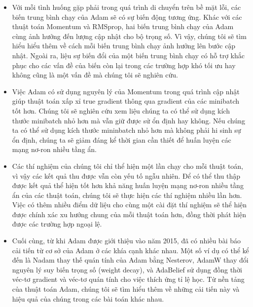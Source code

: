 \begin{itemize}
	\item Với mỗi tình huống gặp phải trong quá trình di chuyển trên bề mặt lỗi, các biến trung bình chạy của Adam sẽ có sự biến động tương ứng. Khác với các thuật toán Momentum và RMSprop, hai biến trung bình chạy của Adam cùng ảnh hưởng đến lượng cập nhật cho bộ trọng số. Vì vậy, chúng tôi sẽ tìm hiểu hiểu thêm về cách mỗi biến trung bình chạy ảnh hưởng lên bước cập nhật. Ngoài ra, liệu sự biến đổi của một biến trung bình chạy có hỗ trợ khắc phục cho các vấn đề của biến còn lại trong các trường hợp khó tối ưu hay không cũng là một vấn đề mà chúng tôi sẽ nghiên cứu.
	\item Việc Adam có sử dụng nguyên lý của Momentum trong quá trình cập nhật giúp thuật toán xấp xỉ true gradient thông qua gradient của các minibatch tốt hơn. Chúng tôi sẽ nghiên cứu xem liệu chúng ta có thể sử dụng kích thước minibatch nhỏ hơn mà vẫn giữ được sử ổn định hay không. Nếu chúng ta có thể sử dụng kích thước mininbatch nhỏ hơn mà không phải hi sinh sự ổn định, chúng ta sẽ giảm đáng kể thời gian cần thiết để huấn luyện các mạng nơ-ron nhiều tầng ẩn.
	\item Các thí nghiệm của chúng tôi chỉ thể hiện một lần chạy cho mỗi thuật toán, vì vậy các kết quả thu được vẫn còn yếu tố ngẫu nhiên. Để có thể thu thập được kết quả thể hiện tốt hơn khả năng huấn luyện mạng nơ-ron nhiều tầng ẩn của các thuật toán, chúng tôi sẽ thực hiện các thí nghiệm nhiều lần hơn. Việc có thêm nhiều điểm dữ liệu cho cùng một cài đặt thí nghiệm sẽ thể hiện được chính xác xu hướng chung của mỗi thuật toán hơn, đồng thời phát hiện được các trường hợp ngoại lệ.
	\item Cuối cùng, từ khi Adam được giới thiệu vào năm 2015, đã có nhiều bài báo cải tiến từ cơ sở của Adam ở các khía cạnh khác nhau. Một số ví dụ có thể kể đến là Nadam \cite{dozat2016incorporating} thay thế quán tính của Adam bằng Nesterov, AdamW \cite{loshchilov2018decoupled} thay đổi nguyên lý suy biến trọng số (weight decay), và AdaBelief \cite{zhuang2020adabelief} sử dụng đồng thời véc-tơ gradient và véc-tơ quán tính cho việc thích ứng tỉ lệ học. Từ nền tảng của thuật toán Adam, chúng tôi sẽ tìm hiểu thêm về những cải tiến này và hiệu quả của chúng trong các bài toán khác nhau.
\end{itemize}